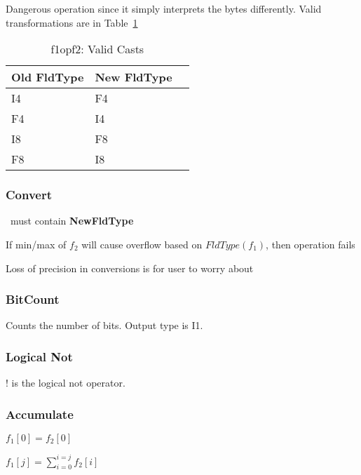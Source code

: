 Dangerous operation since it simply interprets the bytes differently. 
Valid transformations are in
Table~\ref{tbl_f1opf2_cast}

\begin{table}
\centering
\begin{tabular}{|l|l|l|} \hline \hline
{\bf Old FldType} & {\bf New FldType} \\ \hline 
I4 & F4 \\ \hline
F4 & I4 \\ \hline
I8 & F8 \\ \hline
F8 & I8 \\ \hline 
\hline
\end{tabular}
\caption{f1opf2: Valid Casts}
\label{tbl_f1opf2_cast}
\end{table}


\subsubsection{Convert}
\label{f1opf2_conv}

\bi
\item \Args\ must contain {\bf NewFldType}
\item If min/max of \(f_2\) will cause overflow based on
\(FldType(f_1)\), then operation fails
\item Loss of precision in conversions is for user to worry about
\ei

\subsubsection{BitCount}
\label{f1opf2_bitcount}

Counts the number of bits. Output type is I1.

\subsubsection{Logical Not}
\label{f1opf2_not}

\(!\) is the logical not operator.

\subsubsection{Accumulate}
\label{f1opf2_accumulate}

\bi
\item \(f_1[0] = f_2[0]\)
\item \(f_1[j] = \sum_{i=0}^{i=j} f_2[i]\)
\ei

